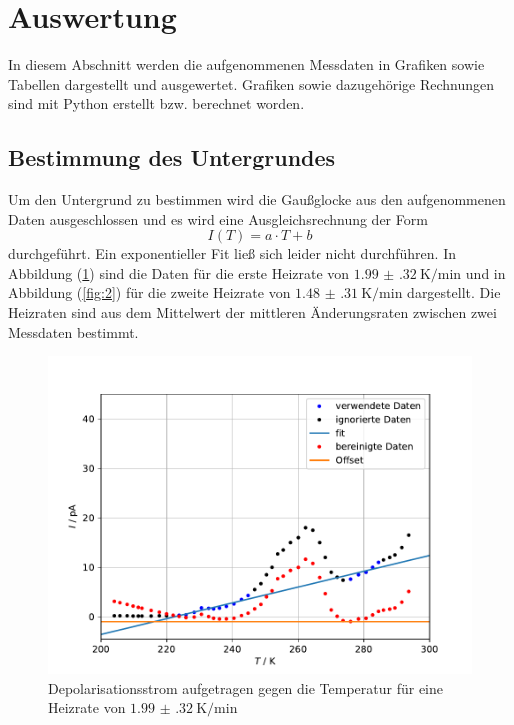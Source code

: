 
\section{Auswertung}
\label{sec:Auswertung}
In diesem Abschnitt werden die aufgenommenen Messdaten in Grafiken sowie Tabellen dargestellt und ausgewertet. Grafiken sowie dazugehörige Rechnungen sind mit Python \cite{python} erstellt bzw. berechnet worden.
\subsection{Bestimmung des Untergrundes}
\label{sec:unter}
Um den Untergrund zu bestimmen wird die Gaußglocke aus den aufgenommenen Daten ausgeschlossen und es wird eine Ausgleichsrechnung der Form
\begin{equation*}
  I(T)=a\cdot T+b
\end{equation*}
durchgeführt. Ein exponentieller Fit ließ sich leider nicht durchführen. In Abbildung (\ref{fig:1}) sind die Daten für die erste Heizrate von $\SI{1.99(32)}{\kelvin\per\minute}$ und in Abbildung (\ref{fig:2}) für die zweite Heizrate von $\SI{1.48(31)}{\kelvin\per\minute}$ dargestellt. Die Heizraten sind aus dem Mittelwert der mittleren Änderungsraten zwischen zwei Messdaten bestimmt.
\begin{figure}[h!]
  \centering
  \includegraphics[scale=0.8]{fig/plot1.pdf}
  \caption{Depolarisationsstrom aufgetragen gegen die Temperatur für eine Heizrate von $\SI{1.99(32)}{\kelvin\per\minute}$}
  \label{fig:1}
\end{figure}
